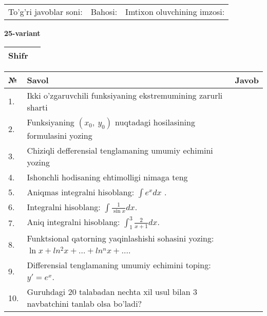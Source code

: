 \documentclass{article}
\begin{document}
  \vspace{1cm}
  
  \begin{tabular}{lll}
  To'g'ri javoblar soni: \underline{\hspace{1.5cm}} & 
  Bahosi: \underline{\hspace{1.5cm}} & 
  Imtixon oluvchining imzosi: \underline{\hspace{2cm}} \\
  \end{tabular}
  
  \egroup
  
  \newpage
  
  
  \textbf{25-variant}\\
  
  \bgroup
  \def\arraystretch{1.6} %
  
  \begin{tabular}{|m{5.7cm}|m{9.5cm}|}
  \hline
  Shifr & \\
  \hline
  \end{tabular}
  
  \vspace{1cm}
  
  \begin{tabular}{|m{0.7cm}|m{10cm}|m{4cm}|}
  \hline
  № & Savol & Javob \\
  \hline
  1. & Ikki o'zgaruvchili funksiyaning ekstremumining zarurli sharti &  \\
  \hline
  2. & Funksiyaning \((x_{0},\ y_{0})\) nuqtadagi hosilasining formulasini yozing &  \\
  \hline
  3. & Chiziqli defferensial tenglamaning umumiy echimini yozing &  \\
  \hline
  4. & Ishonchli hodisaning ehtimolligi nimaga teng &  \\
  \hline
  5. & Aniqmas integralni hisoblang: \(\int {e^{x}dx}\) . &  \\
  \hline
  6. & Integralni hisoblang: \(\int {\frac{1}{\sin x}dx}\). &  \\
  \hline
  7. & Aniq integralni hisoblang: \(\int_{1}^{3}\frac{2}{x + 1}dx\). &  \\
  \hline
  8. & Funktsional qatorning yaqinlashishi sohasini yozing: \(\ln x + ln^{2}x + ... + ln^{n}x + ...\). &  \\
  \hline
  9. & Differensial tenglamaning umumiy echimini toping: \(y' = e^{x}\). &  \\
  \hline
  10. & Guruhdagi 20 talabadan nechta xil usul bilan 3 navbatchini tanlab olsa bo'ladi? &  \\
  \hline
  \end{tabular}
  
\end{document}
